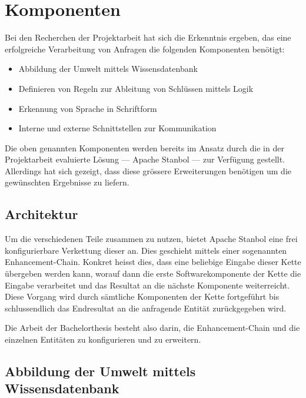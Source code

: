 \chapter{Komponenten}
\label{chap:komponenten}

Bei den Recherchen der Projektarbeit hat sich die Erkenntnis ergeben, das eine erfolgreiche Verarbeitung von Anfragen die folgenden Komponenten benötigt:
\begin{itemize}
	\item Abbildung der Umwelt mittels Wissensdatenbank
	\item Definieren von Regeln zur Ableitung von Schlüssen mittels Logik
	\item Erkennung von Sprache in Schriftform
	\item Interne und externe Schnittstellen zur Kommunikation
\end{itemize}

Die oben genannten Komponenten werden bereits im Ansatz durch die in der Projektarbeit evaluierte Lösung --- Apache Stanbol --- zur Verfügung gestellt. Allerdings hat sich gezeigt, dass diese grössere Erweiterungen benötigen um die gewünschten Ergebnisse zu liefern.

\section{Architektur}
\label{sec:architektur}
Um die verschiedenen Teile zusammen zu nutzen, bietet Apache Stanbol eine frei konfigurierbare Verkettung dieser an. Dies geschieht mittels einer sogenannten Enhancement-Chain. Konkret heisst dies, dass eine beliebige Eingabe dieser Kette übergeben werden kann, worauf dann die erste Softwarekomponente der Kette die Eingabe verarbeitet und das Resultat an die nächste Komponente weiterreicht. Diese Vorgang wird durch sämtliche Komponenten der Kette fortgeführt bis schlussendlich das Endresultat an die anfragende Entität zurückgegeben wird.

Die Arbeit der Bachelorthesis besteht also darin, die Enhancement-Chain und die einzelnen Entitäten zu konfigurieren und zu erweitern.


\section{Abbildung der Umwelt mittels Wissensdatenbank}
\label{sec:architektur_wissensdatenbank}
